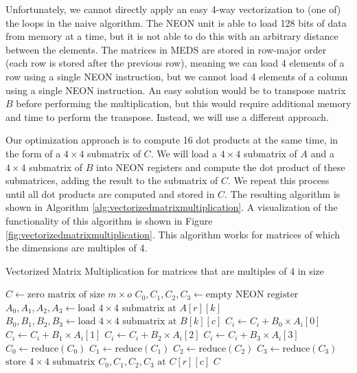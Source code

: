 \documentclass[11pt,a4paper]{report}
\theoremstyle{definition}
\begin{document}
Unfortunately, we cannot directly apply an easy 4-way vectorization to (one of) the loops in the naive algorithm. The NEON unit is able to load 128 bits of data from memory at a time, but it is not able to do this with an arbitrary distance between the elements. The matrices in MEDS are stored in row-major order (each row is stored after the previous row), meaning we can load 4 elements of a row using a single NEON instruction, but we cannot load 4 elements of a column using a single NEON instruction. An easy solution would be to transpose matrix $B$ before performing the multiplication, but this would require additional memory and time to perform the transpose. Instead, we will use a different approach.

Our optimization approach is to compute 16 dot products at the same time, in the form of a $4\times4$ submatrix of $C$. We will load a $4\times4$ submatrix of $A$ and a $4\times4$ submatrix of $B$ into NEON registers and compute the dot product of these submatrices, adding the result to the submatrix of $C$. We repeat this process until all dot products are computed and stored in $C$. The resulting algorithm is shown in Algorithm \ref{alg:vectorizedmatrixmultiplication}. A visualization of the functionality of this algorithm is shown in Figure \ref{fig:vectorizedmatrixmultiplication}. This algorithm works for matrices of which the dimensions are multiples of 4.

\begin{algorithm}
  \caption{Vectorized Matrix Multiplication for matrices that are multiples of 4 in size}
  \label{alg:vectorizedmatrixmultiplication}
  \begin{algorithmic}
      \State $C \gets \text{zero matrix of size } m \times o$
          \State $C_0, C_1, C_2, C_3 \gets \text{empty NEON register}$
            \State $A_0, A_1, A_2, A_3 \gets \text{load } 4\times4 \text{ submatrix at } A[r][k]$
            \State $B_0, B_1, B_2, B_3 \gets \text{load } 4\times4 \text{ submatrix at } B[k][c]$
              \State $C_i \gets C_i + B_0 \times A_i[0]$
              \State $C_i \gets C_i + B_1 \times A_i[1]$
              \State $C_i \gets C_i + B_2 \times A_i[2]$
              \State $C_i \gets C_i + B_3 \times A_i[3]$
            \EndFor
          \EndFor
          \State $C_0 \gets \text{reduce}(C_0)$
          \State $C_1 \gets \text{reduce}(C_1)$
          \State $C_2 \gets \text{reduce}(C_2)$
          \State $C_3 \gets \text{reduce}(C_3)$
          \State $\text{store } 4\times4 \text{ submatrix } C_0, C_1, C_2, C_3 \text{ at } C[r][c]$
        \EndFor
      \EndFor
      \State \Return $C$
    \EndFunction
  \end{algorithmic}
\end{algorithm}
\end{document}

